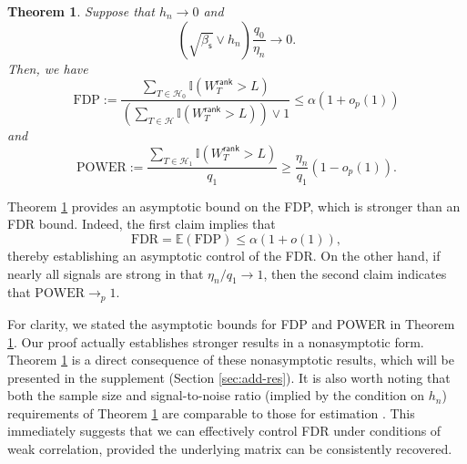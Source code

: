 \documentclass[12pt]{article}
\newcommand{\E}{\mathbb{E}}
\newcommand{\cH}{\mathcal{H}}
\newcommand{\bbI}{\mathbb{I}}
\newtheorem{Theorem}{Theorem}
\theoremstyle{plain}
\begin{document}
\begin{sloppypar}
\begin{Theorem}\label{thm:weak-cor-fdr}
Suppose that $h_n\to 0$ and
$$
\left(\sqrt{\beta_{\mathsf{s}}} \vee  h_n \right)  \frac{q_0}{\eta_n}   \to 0. 
$$
Then, we have
$$
\mathrm{FDP}:=\frac{\sum_{T\in \cH_0  } \bbI(W_T^{\mathsf{rank}} >L ) }{\left( \sum_{T\in \cH  } \bbI(W_T^{\mathsf{rank}} >L ) \right) \vee 1 }\le \alpha(1+o_p(1))
$$
and
$$
\mathrm{POWER}:= \frac{\sum_{T\in \cH_1  } \bbI(W_T^{\mathsf{rank}} >L ) }{q_1} \ge \frac{\eta_n}{q_1}(1-o_p(1)).
$$
\end{Theorem}
Theorem \ref{thm:weak-cor-fdr} provides an asymptotic bound on the FDP, which is stronger than an FDR bound. Indeed, the first claim implies that
\begin{equation}\label{eq:fdr-exp}
\text{FDR} = \E(\text{FDP}) \le \alpha  (1 + o(1)),
\end{equation}
thereby establishing an asymptotic control of the FDR. On the other hand, if nearly all signals are strong in that $\eta_n/q_1\to 1$, then the second claim indicates that $\text{POWER}\to_p 1$. 

For clarity, we stated the asymptotic bounds for FDP and POWER in Theorem \ref{thm:weak-cor-fdr}. Our proof actually establishes stronger results in a nonasymptotic form. Theorem \ref{thm:weak-cor-fdr} is a direct consequence of these nonasymptotic results, which will be presented in the supplement (Section \ref{sec:add-res}). It is also worth noting that both the sample size and signal-to-noise ratio (implied by the condition on $h_n$) requirements of Theorem \ref{thm:weak-cor-fdr} are comparable to those for estimation \citep{keshavan2010matrix_b,ma2018implicit,xia2021statistical}. This immediately suggests that we can effectively control FDR under conditions of weak correlation, provided the underlying matrix can be consistently recovered.


\end{sloppypar}
\end{document}
